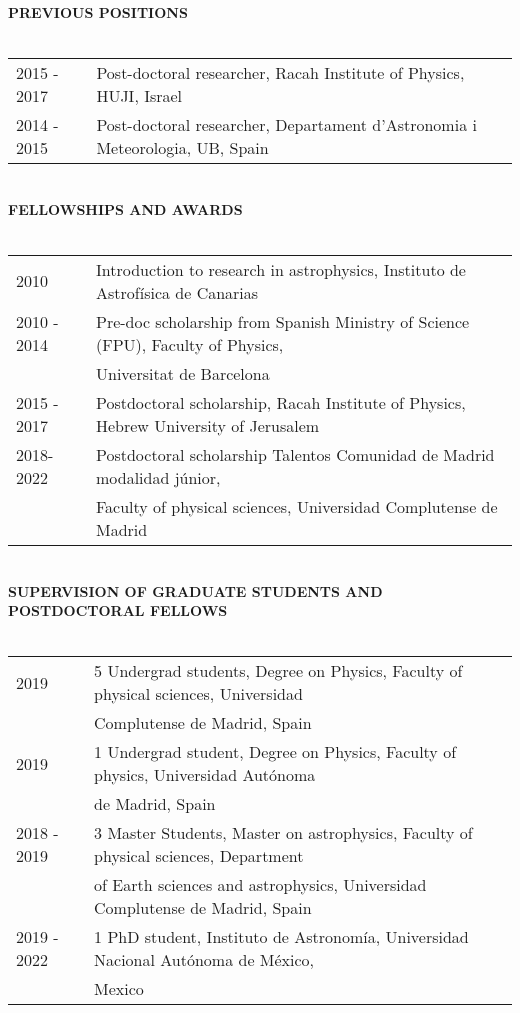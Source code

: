 \documentclass[oneside, a4paper, onecolumn, 11pt]{article}
\begin{document}
{{\bf PREVIOUS POSITIONS}\\
\\
\begin{tabular}{ll}
2015 - 2017 & Post-doctoral researcher, Racah Institute of Physics, HUJI, Israel\\
2014 - 2015 & Post-doctoral researcher, Departament d'Astronomia i Meteorologia, UB, Spain
	\end{tabular}\\

{\bf FELLOWSHIPS AND AWARDS}\\
\\
\begin{tabular}{ll}
2010 &	Introduction to research in astrophysics, Instituto de Astrofísica de Canarias \\
2010 - 2014 &	Pre-doc scholarship from Spanish Ministry of Science (FPU), Faculty of Physics,\\ 
 & Universitat de Barcelona \\
2015 - 2017 & Postdoctoral scholarship, Racah Institute of Physics, Hebrew University of Jerusalem \\
2018-2022 & Postdoctoral scholarship Talentos Comunidad de Madrid modalidad júnior,\\
& Faculty of physical sciences, Universidad Complutense de Madrid \\
	\end{tabular}\\

{\bf SUPERVISION OF GRADUATE STUDENTS AND POSTDOCTORAL FELLOWS}\\
\\
\begin{tabular}{ll}
2019 & 5 Undergrad students, Degree on Physics, Faculty of physical sciences, Universidad \\
 & Complutense de Madrid, Spain \\
2019 & 1 Undergrad student, Degree on Physics, Faculty of physics, Universidad Autónoma \\
 & de Madrid, Spain \\
2018 - 2019 &	3 Master Students, Master on astrophysics, Faculty of physical sciences, Department\\
 & of Earth sciences and astrophysics, Universidad Complutense de Madrid, Spain \\
2019 - 2022 & 1 PhD student, Instituto de Astronomía, Universidad Nacional Autónoma de México,\\
 & Mexico \\
	\end{tabular}\\

}
\end{document}
